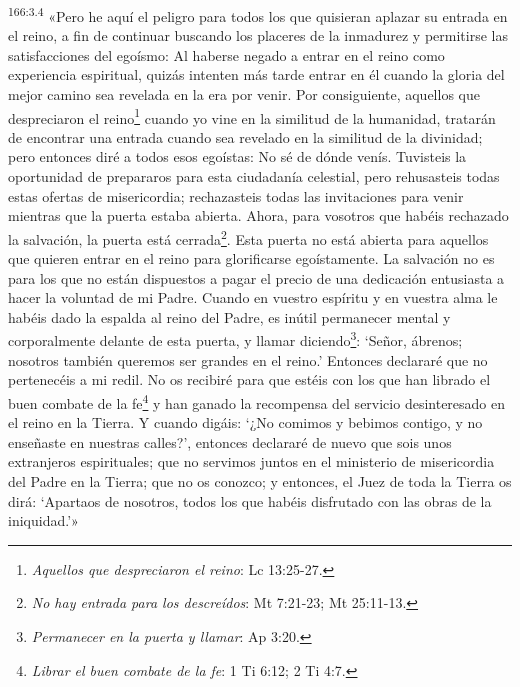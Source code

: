 \par
\textsuperscript{166:3.4} «Pero he aquí el peligro para todos los que quisieran aplazar su entrada en el reino, a fin de continuar buscando los placeres de la inmadurez y permitirse las satisfacciones del egoísmo: Al haberse negado a entrar en el reino como experiencia espiritual, quizás intenten más tarde entrar en él cuando la gloria del mejor camino sea revelada en la era por venir. Por consiguiente, aquellos que despreciaron el reino\footnote{\textit{Aquellos que despreciaron el reino}: Lc 13:25-27.} cuando yo vine en la similitud de la humanidad, tratarán de encontrar una entrada cuando sea revelado en la similitud de la divinidad; pero entonces diré a todos esos egoístas: No sé de dónde venís. Tuvisteis la oportunidad de prepararos para esta ciudadanía celestial, pero rehusasteis todas estas ofertas de misericordia; rechazasteis todas las invitaciones para venir mientras que la puerta estaba abierta. Ahora, para vosotros que habéis rechazado la salvación, la puerta está cerrada\footnote{\textit{No hay entrada para los descreídos}: Mt 7:21-23; Mt 25:11-13.}. Esta puerta no está abierta para aquellos que quieren entrar en el reino para glorificarse egoístamente. La salvación no es para los que no están dispuestos a pagar el precio de una dedicación entusiasta a hacer la voluntad de mi Padre. Cuando en vuestro espíritu y en vuestra alma le habéis dado la espalda al reino del Padre, es inútil permanecer mental y corporalmente delante de esta puerta, y llamar diciendo\footnote{\textit{Permanecer en la puerta y llamar}: Ap 3:20.}: `Señor, ábrenos; nosotros también queremos ser grandes en el reino.' Entonces declararé que no pertenecéis a mi redil. No os recibiré para que estéis con los que han librado el buen combate de la fe\footnote{\textit{Librar el buen combate de la fe}: 1 Ti 6:12; 2 Ti 4:7.} y han ganado la recompensa del servicio desinteresado en el reino en la Tierra. Y cuando digáis: `¿No comimos y bebimos contigo, y no enseñaste en nuestras calles?', entonces declararé de nuevo que sois unos extranjeros espirituales; que no servimos juntos en el ministerio de misericordia del Padre en la Tierra; que no os conozco; y entonces, el Juez de toda la Tierra os dirá: `Apartaos de nosotros, todos los que habéis disfrutado con las obras de la iniquidad.'»

